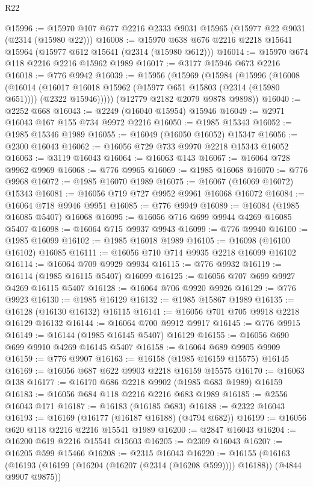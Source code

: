 \begin{lexlean}{R22}
\begin{coremodule}
@15996 := @15970 @107 @677 @2216 @2333 @9031 @15965 (@15977 @22 @9031 (@2314 (@15980 @22)))
@16008 := @15970 @638 @676 @2216 @2218 @15641 @15964 (@15977 @612 @15641 (@2314 (@15980 @612)))
@16014 := @15970 @674 @118 @2216 @2216 @15962 @1989
@16017 := @3177 @15946 @673 @2216
@16018 := @776 @9942
@16039 := @15956
    (@15969
      (@15984
        (@15996
          (@16008
            (@16014
              (@16017 @16018 @15962 (@15977 @651 @15803 (@2314 (@15980 @651))))
              (@2322 @15946)))))
      (@12779 @2182 @2079 @9878 @9898))
@16040 := @2252 @668
@16043 := @2249 (@16040 @15954) @15946
@16049 := @2971 @16043 @167 @155 @734 @9972 @2216
@16050 := @1985 @15343
@16052 := @1985 @15346 @1989
@16055 := @16049 (@16050 @16052) @15347
@16056 := @2300 @16043
@16062 := @16056 @729 @733 @9970 @2218 @15343 @16052
@16063 := @3119 @16043
@16064 := @16063 @143
@16067 := @16064 @728 @9962 @9969
@16068 := @776 @9965
@16069 := @1985 @16068
@16070 := @776 @9968
@16072 := @1985 @16070 @1989
@16075 := @16067 (@16069 @16072) @15343
@16081 := @16056 @719 @727 @9952 @9961 @16068 @16072
@16084 := @16064 @718 @9946 @9951
@16085 := @776 @9949
@16089 := @16084 (@1985 @16085 @5407) @16068
@16095 := @16056 @716 @699 @9944 @4269 @16085 @5407
@16098 := @16064 @715 @9937 @9943
@16099 := @776 @9940
@16100 := @1985 @16099
@16102 := @1985 @16018 @1989
@16105 := @16098 (@16100 @16102) @16085
@16111 := @16056 @710 @714 @9935 @2218 @16099 @16102
@16114 := @16064 @709 @9929 @9934
@16115 := @776 @9932
@16119 := @16114 (@1985 @16115 @5407) @16099
@16125 := @16056 @707 @699 @9927 @4269 @16115 @5407
@16128 := @16064 @706 @9920 @9926
@16129 := @776 @9923
@16130 := @1985 @16129
@16132 := @1985 @15867 @1989
@16135 := @16128 (@16130 @16132) @16115
@16141 := @16056 @701 @705 @9918 @2218 @16129 @16132
@16144 := @16064 @700 @9912 @9917
@16145 := @776 @9915
@16149 := @16144 (@1985 @16145 @5407) @16129
@16155 := @16056 @690 @699 @9910 @4269 @16145 @5407
@16158 := @16064 @689 @9905 @9909
@16159 := @776 @9907
@16163 := @16158 (@1985 @16159 @15575) @16145
@16169 := @16056 @687 @622 @9903 @2218 @16159 @15575
@16170 := @16063 @138
@16177 := @16170 @686 @2218 @9902 (@1985 @683 @1989) @16159
@16183 := @16056 @684 @118 @2216 @2216 @683 @1989
@16185 := @2556 @16043 @171
@16187 := @16183 (@16185 @683)
@16188 := @2322 @16043
@16193 := @16169 (@16177 (@16187 @16188) (@4794 @682))
@16199 := @16056 @620 @118 @2216 @2216 @15541 @1989
@16200 := @2847 @16043
@16204 := @16200 @619 @2216 @15541 @15603
@16205 := @2309 @16043
@16207 := @16205 @599 @15466
@16208 := @2315 @16043
@16220 := @16155
    (@16163 (@16193 (@16199 (@16204 (@16207 (@2314 (@16208 @599)))) @16188)) (@4844 @9907 @9875))

\end{coremodule}
\end{lexlean}
